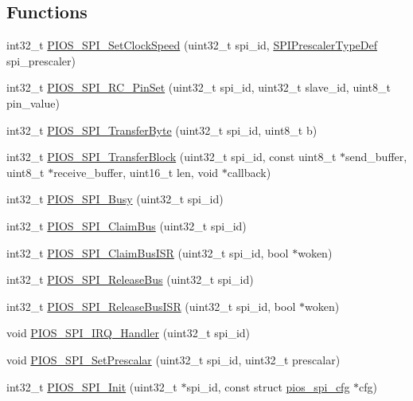 \subsection*{\-Functions}
\begin{DoxyCompactItemize}
\item 
int32\-\_\-t \hyperlink{group___p_i_o_s___s_p_i_ga5e8329c2d8543fe240f50571bf87eb22}{\-P\-I\-O\-S\-\_\-\-S\-P\-I\-\_\-\-Set\-Clock\-Speed} (uint32\-\_\-t spi\-\_\-id, \hyperlink{group___p_i_o_s___s_p_i_gacc2b1ca1c7cd8aeef04fee955ef7ffd2}{\-S\-P\-I\-Prescaler\-Type\-Def} spi\-\_\-prescaler)
\item 
int32\-\_\-t \hyperlink{group___p_i_o_s___s_p_i_gaae1c8b2fa4574c575994c1fd591233a6}{\-P\-I\-O\-S\-\_\-\-S\-P\-I\-\_\-\-R\-C\-\_\-\-Pin\-Set} (uint32\-\_\-t spi\-\_\-id, uint32\-\_\-t slave\-\_\-id, uint8\-\_\-t pin\-\_\-value)
\item 
int32\-\_\-t \hyperlink{group___p_i_o_s___s_p_i_gaa65b0b0a89e87c3e8f13c00ee0b91563}{\-P\-I\-O\-S\-\_\-\-S\-P\-I\-\_\-\-Transfer\-Byte} (uint32\-\_\-t spi\-\_\-id, uint8\-\_\-t b)
\item 
int32\-\_\-t \hyperlink{group___p_i_o_s___s_p_i_ga7dc994b4889415502021540ebbd2fce3}{\-P\-I\-O\-S\-\_\-\-S\-P\-I\-\_\-\-Transfer\-Block} (uint32\-\_\-t spi\-\_\-id, const uint8\-\_\-t $\ast$send\-\_\-buffer, uint8\-\_\-t $\ast$receive\-\_\-buffer, uint16\-\_\-t len, void $\ast$callback)
\item 
int32\-\_\-t \hyperlink{group___p_i_o_s___s_p_i_ga2c561c9f63706d774c1b5ed7df2e17f5}{\-P\-I\-O\-S\-\_\-\-S\-P\-I\-\_\-\-Busy} (uint32\-\_\-t spi\-\_\-id)
\item 
int32\-\_\-t \hyperlink{group___p_i_o_s___s_p_i_ga307f60532c61b56c285ce5d680cb14c5}{\-P\-I\-O\-S\-\_\-\-S\-P\-I\-\_\-\-Claim\-Bus} (uint32\-\_\-t spi\-\_\-id)
\item 
int32\-\_\-t \hyperlink{group___p_i_o_s___s_p_i_gaa42e1b9f8f8628cf28c3612fc1f7f9d1}{\-P\-I\-O\-S\-\_\-\-S\-P\-I\-\_\-\-Claim\-Bus\-I\-S\-R} (uint32\-\_\-t spi\-\_\-id, bool $\ast$woken)
\item 
int32\-\_\-t \hyperlink{group___p_i_o_s___s_p_i_ga117fbed6d00c5404e9414ab72175e1c8}{\-P\-I\-O\-S\-\_\-\-S\-P\-I\-\_\-\-Release\-Bus} (uint32\-\_\-t spi\-\_\-id)
\item 
int32\-\_\-t \hyperlink{group___p_i_o_s___s_p_i_ga9b61d0c23476fd3a67c887c13c666a67}{\-P\-I\-O\-S\-\_\-\-S\-P\-I\-\_\-\-Release\-Bus\-I\-S\-R} (uint32\-\_\-t spi\-\_\-id, bool $\ast$woken)
\item 
void \hyperlink{group___p_i_o_s___s_p_i_ga018ed8c0b8d0c9a22faf6faca9b5a895}{\-P\-I\-O\-S\-\_\-\-S\-P\-I\-\_\-\-I\-R\-Q\-\_\-\-Handler} (uint32\-\_\-t spi\-\_\-id)
\item 
void \hyperlink{group___p_i_o_s___s_p_i_ga8d8a9bc28c1c30e41e662da188d12cd7}{\-P\-I\-O\-S\-\_\-\-S\-P\-I\-\_\-\-Set\-Prescalar} (uint32\-\_\-t spi\-\_\-id, uint32\-\_\-t prescalar)
\item 
int32\-\_\-t \hyperlink{group___p_i_o_s___s_p_i_ga8bbe024685ab860a8e5880b2ed2b11e6}{\-P\-I\-O\-S\-\_\-\-S\-P\-I\-\_\-\-Init} (uint32\-\_\-t $\ast$spi\-\_\-id, const struct \hyperlink{structpios__spi__cfg}{pios\-\_\-spi\-\_\-cfg} $\ast$cfg)
\end{DoxyCompactItemize}


